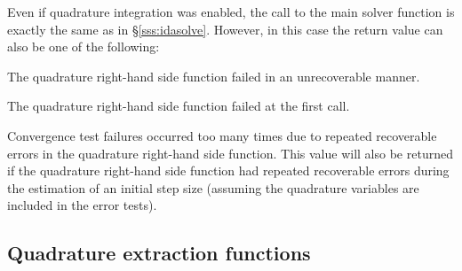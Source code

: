 {Even if quadrature integration was enabled, the call to the main solver
function  is exactly the same as in \S\ref{sss:idasolve}. However, in
this case the return value  can also be one of the following:
\begin{args}
\item[\Id{IDA\_QRHS\_FAIL}]
  The quadrature right-hand side function failed in an unrecoverable manner.
\item[\Id{IDA\_FIRST\_QRHS\_ERR}]
  The quadrature right-hand side function failed at the first call.
\item[\Id{IDA\_REP\_QRHS\_ERR}]
  Convergence test failures occurred too many times due to repeated
  recoverable errors in the quadrature right-hand side function. This
  value will also be returned if the quadrature right-hand side function
  had repeated recoverable errors during the estimation of an initial step
  size (assuming the quadrature variables are included in the error tests).
  \end{args}


\subsection{Quadrature extraction functions}\label{ss:quad_get}

}
